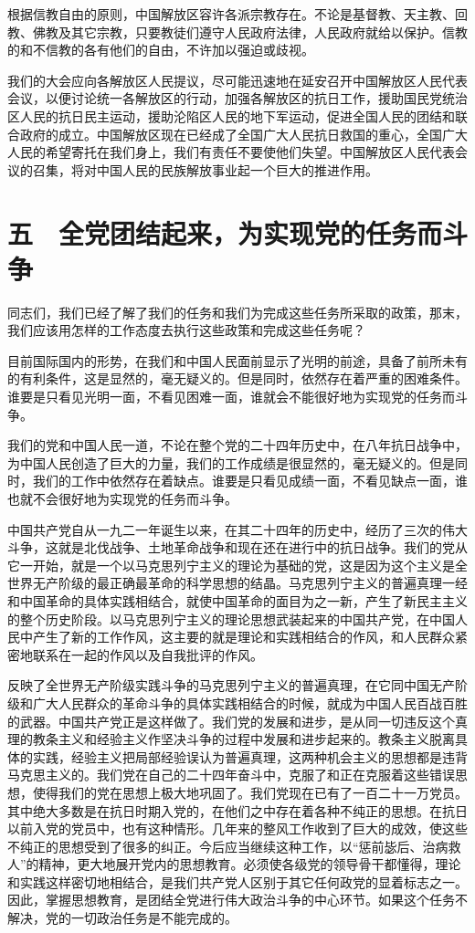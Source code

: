 根据信教自由的原则，中国解放区容许各派宗教存在。不论是基督教、天主教、回教、佛教及其它宗教，只要教徒们遵守人民政府法律，人民政府就给以保护。信教的和不信教的各有他们的自由，不许加以强迫或歧视。

我们的大会应向各解放区人民提议，尽可能迅速地在延安召开中国解放区人民代表会议，以便讨论统一各解放区的行动，加强各解放区的抗日工作，援助国民党统治区人民的抗日民主运动，援助沦陷区人民的地下军运动，促进全国人民的团结和联合政府的成立。中国解放区现在已经成了全国广大人民抗日救国的重心，全国广大人民的希望寄托在我们身上，我们有责任不要使他们失望。中国解放区人民代表会议的召集，将对中国人民的民族解放事业起一个巨大的推进作用。

\section{五　全党团结起来，为实现党的任务而斗争}

同志们，我们已经了解了我们的任务和我们为完成这些任务所采取的政策，那末，我们应该用怎样的工作态度去执行这些政策和完成这些任务呢？

目前国际国内的形势，在我们和中国人民面前显示了光明的前途，具备了前所未有的有利条件，这是显然的，毫无疑义的。但是同时，依然存在着严重的困难条件。谁要是只看见光明一面，不看见困难一面，谁就会不能很好地为实现党的任务而斗争。

我们的党和中国人民一道，不论在整个党的二十四年历史中，在八年抗日战争中，为中国人民创造了巨大的力量，我们的工作成绩是很显然的，毫无疑义的。但是同时，我们的工作中依然存在着缺点。谁要是只看见成绩一面，不看见缺点一面，谁也就不会很好地为实现党的任务而斗争。

中国共产党自从一九二一年诞生以来，在其二十四年的历史中，经历了三次的伟大斗争，这就是北伐战争、土地革命战争和现在还在进行中的抗日战争。我们的党从它一开始，就是一个以马克思列宁主义的理论为基础的党，这是因为这个主义是全世界无产阶级的最正确最革命的科学思想的结晶。马克思列宁主义的普遍真理一经和中国革命的具体实践相结合，就使中国革命的面目为之一新，产生了新民主主义的整个历史阶段。以马克思列宁主义的理论思想武装起来的中国共产党，在中国人民中产生了新的工作作风，这主要的就是理论和实践相结合的作风，和人民群众紧密地联系在一起的作风以及自我批评的作风。

反映了全世界无产阶级实践斗争的马克思列宁主义的普遍真理，在它同中国无产阶级和广大人民群众的革命斗争的具体实践相结合的时候，就成为中国人民百战百胜的武器。中国共产党正是这样做了。我们党的发展和进步，是从同一切违反这个真理的教条主义和经验主义作坚决斗争的过程中发展和进步起来的。教条主义脱离具体的实践，经验主义把局部经验误认为普遍真理，这两种机会主义的思想都是违背马克思主义的。我们党在自己的二十四年奋斗中，克服了和正在克服着这些错误思想，使得我们的党在思想上极大地巩固了。我们党现在已有了一百二十一万党员。其中绝大多数是在抗日时期入党的，在他们之中存在着各种不纯正的思想。在抗日以前入党的党员中，也有这种情形。几年来的整风工作收到了巨大的成效，使这些不纯正的思想受到了很多的纠正。今后应当继续这种工作，以“惩前毖后、治病救人”的精神，更大地展开党内的思想教育。必须使各级党的领导骨干都懂得，理论和实践这样密切地相结合，是我们共产党人区别于其它任何政党的显着标志之一。因此，掌握思想教育，是团结全党进行伟大政治斗争的中心环节。如果这个任务不解决，党的一切政治任务是不能完成的。

